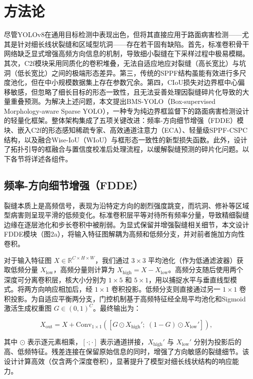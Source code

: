 \documentclass[twocolumn]{sn-jnl}
\begin{document}
	\section{方法论}
	尽管YOLOv8在通用目标检测中表现出色，但将其直接应用于路面病害检测——尤其是针对细长线状裂缝和区域型坑洞——存在若干固有缺陷。首先，标准卷积骨干网络缺乏显式增强高频方向信息的机制，导致细小裂缝在下采样过程中极易模糊。其次，C2f模块采用同质化的卷积堆叠，无法自适应地应对裂缝（高长宽比）与坑洞（低长宽比）之间的极端形态差异。第三，传统的SPPF结构虽能有效进行多尺度池化，但在中小规模数据集上存在参数冗余。第四，CIoU损失对边界框中心偏移敏感，但忽略了细长目标的形态一致性，且无法妥善处理因裂缝碎片化导致的大量重叠预测。为解决上述问题，本文提出BMS-YOLO（Box-supervised Morphology-aware Sparse YOLO），一种专为纯边界框监督下的路面病害检测设计的轻量化框架。整体架构集成了五项关键改进：频率-方向细节增强（FDDE）模块、嵌入C2f的形态感知稀疏专家、高效通道注意力（ECA）、轻量级SPPF-CSPC结构，以及融合Wise-IoU（WIoU）与框形态一致性的新型损失函数。此外，设计了拓扑引导的框融合与置信度校准后处理流程，以缓解裂缝预测的碎片化问题。以下各节将详述各组件。
	
	\subsection{频率-方向细节增强（FDDE）}
	裂缝本质上是高频信号，表现为沿特定方向的剧烈强度跳变，而坑洞、修补等区域型病害则呈现平滑的低频变化。标准卷积层平等对待所有频率分量，导致精细裂缝边缘在逐层池化和步长卷积中被削弱。为显式保留并增强裂缝相关细节，本文设计FDDE模块（图2a），将输入特征图解耦为高频和低频分支，并对前者施加方向性卷积。
	
	对于输入特征图 \(X \in \mathbb{R}^{C \times H \times W}\)，我们通过 \(3\times3\) 平均池化（作为低通滤波器）获取低频分量 \(X_{\text{low}}\)，高频分量则计算为 \(X_{\text{high}} = X - X_{\text{low}}\)。高频分支随后使用两个深度可分离卷积层，核大小分别为 \(1\times5\) 和 \(5\times1\)，用以捕捉水平与垂直线型模式。将两方向响应相加后，经 \(1\times1\) 卷积投影。低频分支则直接通过另一 \(1\times1\) 卷积投影。为自适应平衡两分支，门控机制基于高频特征经全局平均池化和Sigmoid激活生成权重图 \(G \in (0,1)^C\)。最终输出为：
	
	\[
	X_{\text{out}} = X + \text{Conv}_{1\times1}\left( \left[ G \odot X_{\text{high}}';\; (1-G) \odot X_{\text{low}}' \right] \right),
	\]
	
	其中 \(\odot\) 表示逐元素相乘，\([\cdot;\cdot]\) 表示通道拼接，\(X_{\text{high}}'\) 与 \(X_{\text{low}}'\) 分别为投影后的高、低频特征。残差连接在保留原始信息的同时，增强了方向敏感的裂缝细节。该设计计算高效（仅含两个深度卷积），显著提升了模型对细长线状结构的响应能力。
	
\end{document}
